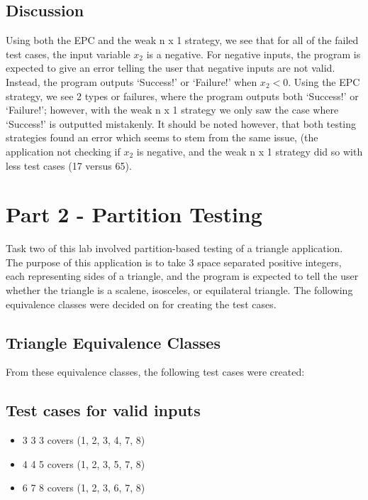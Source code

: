 \documentclass[letterpaper]{article}
\begin{document}
\subsection{Discussion}
Using both the EPC and the weak n x 1 strategy, we see that for all of the
failed test cases, the input variable $x_2$ is a negative. For negative
inputs, the program is expected to give an error telling the user that 
negative inputs are not valid. Instead, the program outputs `Success!'
or `Failure!' when $x_2 < 0$. Using the EPC strategy, we see
2 types or failures, where the program outputs both `Success!'                       
or `Failure!'; however, with the weak n x 1 strategy we only saw the case where
`Success!' is outputted mistakenly. It should be noted however, that both
testing strategies found an error which seems to stem from the same issue,
(the application not checking if $x_2$ is negative, and the weak n x 1 strategy
did so with less test cases (17 versus 65).


\section*{Part 2 - Partition Testing}
Task two of this lab involved partition-based testing of a triangle application.
The purpose of this application is to take 3 space separated positive integers,
each representing sides of a triangle, and the program is expected to tell the
user whether the triangle is a scalene, isosceles, or equilateral triangle.
The following equivalence classes were decided on for creating the test cases.
\subsection*{Triangle Equivalence Classes}


From these equivalence classes, the following test cases were created:

\subsection*{Test cases for valid inputs}
\begin{itemize}
    \item 3 3 3 covers (1, 2, 3, 4, 7, 8)
    \item 4 4 5 covers (1, 2, 3, 5, 7, 8)
    \item 6 7 8 covers (1, 2, 3, 6, 7, 8)
\end{itemize}
\end{document}
